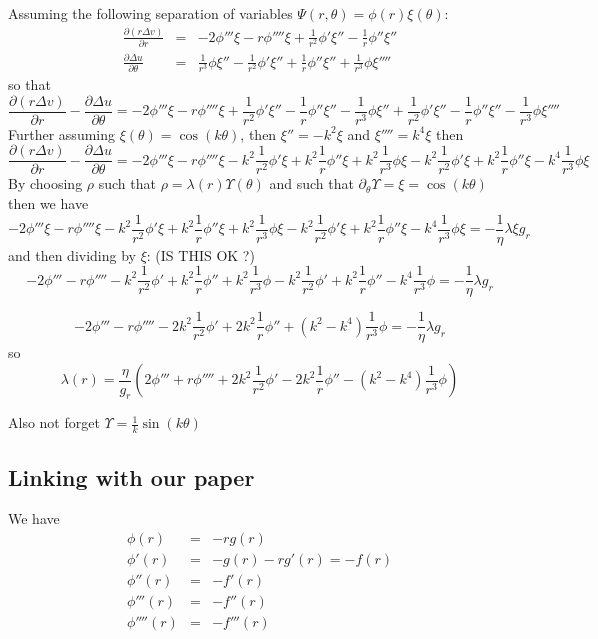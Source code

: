 Assuming the following separation of variables $\boxed{\Psi(r,\theta)=\phi(r)\xi(\theta)}$:
\begin{eqnarray}
\frac{\partial (r  \Delta v)}{\partial r}
&=& -2 \phi''' \xi - r \phi'''' \xi + \frac{1}{r^2} \phi' \xi''  - \frac{1}{r} \phi'' \xi'' \\
\frac{\partial  \Delta u}{\partial \theta}
&=&
\frac{1}{r^3} \phi \xi '' -
\frac{1}{r^2} \phi' \xi'' +
\frac{1}{r} \phi'' \xi'' +
\frac{1}{r^3} \phi \xi''''
\end{eqnarray}
so that 
\[
\frac{\partial (r  \Delta v)}{\partial r} - \frac{\partial  \Delta u}{\partial \theta}
=  -2 \phi''' \xi - r \phi'''' \xi + \frac{1}{r^2} \phi' \xi''  - \frac{1}{r} \phi'' \xi'' 
-\frac{1}{r^3} \phi \xi '' +
\frac{1}{r^2} \phi' \xi'' -
\frac{1}{r} \phi'' \xi'' -
\frac{1}{r^3} \phi \xi''''
\]
Further assuming $\boxed{\xi(\theta)=\cos(k\theta)}$, then $\xi''=-k^2 \xi$ and $\xi''''=k^4 \xi$
then 
\[
\frac{\partial (r  \Delta v)}{\partial r} - \frac{\partial  \Delta u}{\partial \theta}
=  -2 \phi''' \xi - r \phi'''' \xi - k^2 \frac{1}{r^2} \phi' \xi  +k^2 \frac{1}{r} \phi'' \xi 
+ k^2\frac{1}{r^3} \phi \xi  
-k^2\frac{1}{r^2} \phi' \xi 
+k^2 \frac{1}{r} \phi'' \xi 
- k^4\frac{1}{r^3} \phi \xi
\]
By choosing $\rho$ such that $\rho= \lambda(r) \Upsilon(\theta)$ and such that 
$\partial_\theta \Upsilon = \xi=\cos(k\theta)$
then we have 
\[
 -2 \phi''' \xi - r \phi'''' \xi - k^2 \frac{1}{r^2} \phi' \xi  +k^2 \frac{1}{r} \phi'' \xi 
+ k^2\frac{1}{r^3} \phi \xi  
-k^2\frac{1}{r^2} \phi' \xi 
+k^2 \frac{1}{r} \phi'' \xi 
- k^4\frac{1}{r^3} \phi \xi
=
- \frac{1}{\eta} \lambda \xi  g_r
\]
and then dividing by $\xi$: (IS THIS OK ?)
\[
 -2 \phi'''  - r \phi''''  - k^2 \frac{1}{r^2} \phi'   +k^2 \frac{1}{r} \phi''  
+ k^2\frac{1}{r^3} \phi 
-k^2\frac{1}{r^2} \phi' 
+k^2 \frac{1}{r} \phi'' 
- k^4\frac{1}{r^3} \phi 
=
- \frac{1}{\eta} \lambda   g_r
\]

\[
-2 \phi'''  - r \phi''''  
- 2k^2 \frac{1}{r^2} \phi'   
+2k^2 \frac{1}{r} \phi''  
+ (k^2-k^4) \frac{1}{r^3} \phi 
=
- \frac{1}{\eta} \lambda   g_r
\]
so 
\[
\boxed{
\lambda(r) = \frac{\eta}{g_r} \left( 
2 \phi'''  + r \phi''''  + 2k^2 \frac{1}{r^2} \phi'   
-2k^2 \frac{1}{r} \phi''  
- (k^2-k^4) \frac{1}{r^3} \phi 
\right)
}
\]

Also not forget $\Upsilon=\frac{1}{k}\sin(k\theta)$

\subsection*{Linking with our paper}
We have 
\begin{eqnarray}
\phi(r) &=& -rg(r) \\
\phi'(r) &=& -g(r) - r g'(r) = -f(r) \\
\phi''(r) &=& -f'(r) \\
\phi'''(r) &=& -f''(r) \\
\phi''''(r) &=& -f'''(r) 
\end{eqnarray}


